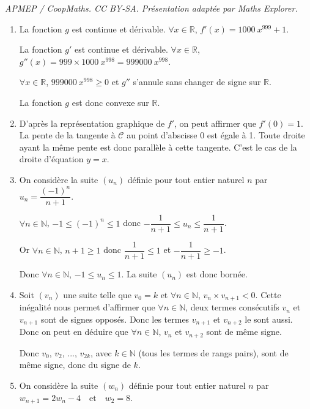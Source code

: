 \documentclass[10pt]{article}
\providecommand{\R}{\mathbb{R}}
\providecommand{\N}{\mathbb{N}}
\providecommand{\np}[2][]{{#2~#1}}
\begin{document}
\noindent\textit{APMEP / CoopMaths. CC BY-SA. Présentation adaptée par Maths Explorer.}\par\medskip
\medskip

\begin{enumerate}
	\item La fonction $g$ est continue et dérivable. $\forall x \in \R$, $f'(x)=\np{1000}x^{999}+1$.
	
La fonction $g'$ est continue et dérivable. $\forall x \in \R$, $g''(x)=999\times \np{1000}x^{998}=\np{999000}x^{998}$.
	
	$\forall x \in \R$, $\np{999000}x^{998}\geqslant 0$ et $g''$ s'annule sans changer de signe sur $\R$.
	
La fonction $g$ est donc convexe sur $\R$. \hfill {}
	\item D'après la représentation graphique de $f'$, on peut affirmer que $f'(0)=1$. La pente de la tangente à $\mathcal{C}$ au point d'abscisse 0 est égale à 1. Toute droite ayant la même pente est donc parallèle à cette tangente. C'est le cas de la droite d'équation $y=x$. 
	
\hfill {}
	\item On considère la suite $\left(u_n\right)$ définie pour tout entier naturel $n$ par $u_n = \dfrac{(-1)^n}{n+1}$.
	
$\forall n \in \N$, $ -1\leqslant (-1)^n \leqslant 1$ donc $-\dfrac{1}{n+1} \leqslant u_n \leqslant \dfrac{1}{n+1}$.
	
Or $\forall n \in \N$, $n+1\geqslant 1$ donc $\dfrac{1}{n+1} \leqslant 1$ et $-\dfrac{1}{n+1} \geqslant -1$.
	
Donc  $\forall n \in \N$, $-1\leqslant u_n \leqslant 1$. La suite $(u_n)$ est donc bornée.
	
\hfill {}
	\item Soit $\left(v_n\right)$ une suite telle que $v_0 = k$ et $\forall n \in \N$, $v_n\times v_{n+1}<0$. Cette inégalité nous permet d'affirmer que $\forall n \in \N$,  deux termes consécutifs $v_n$ et $v_{n+1}$ sont de signes opposés. Donc les termes  $v_{n+1}$ et  $v_{n+2}$ le sont aussi. Donc on peut en déduire que $\forall n \in \N$, $v_n$ et $v_{n+2}$  sont de même signe.
	
Donc $v_0$, $v_2$, ..., $v_{2k}$, \: avec $k\in \N$ (tous les termes de rangs pairs), sont de même signe, donc du signe de $k$.
	
\hfill {}
	\item On considère la suite $\left(w_n\right)$ définie pour tout entier naturel $n$ par $w_{n+1} = 2w_n - 4\quad \text{et}\quad  w_2 = 8$.
	

\end{enumerate}
\end{document}
